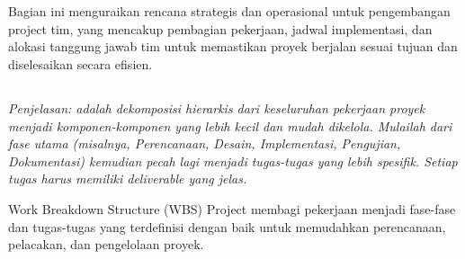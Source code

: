 \documentclass{elsinta}
\begin{document}
\section{\ImplementationPlanTitle}

Bagian ini menguraikan rencana strategis dan operasional untuk pengembangan project tim,  yang mencakup pembagian pekerjaan, jadwal implementasi, dan alokasi tanggung jawab tim untuk memastikan proyek berjalan sesuai tujuan dan diselesaikan secara efisien.

\subsection{\WBSTitle}
\textit{Penjelasan:  adalah dekomposisi hierarkis dari keseluruhan pekerjaan proyek menjadi komponen-komponen yang lebih kecil dan mudah dikelola. Mulailah dari fase utama (misalnya, Perencanaan, Desain, Implementasi, Pengujian, Dokumentasi) kemudian pecah lagi menjadi tugas-tugas yang lebih spesifik. Setiap tugas harus memiliki deliverable yang jelas.}

 Work Breakdown Structure (WBS) Project  membagi pekerjaan menjadi fase-fase dan tugas-tugas yang terdefinisi dengan baik untuk memudahkan perencanaan, pelacakan, dan pengelolaan proyek.
\end{document}
